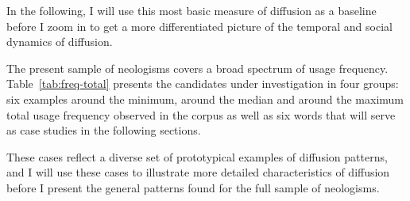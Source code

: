 \documentclass[
  a4paper,
  abstract=on,
  captions=tableabove
  ]{scrartcl}
\begin{document}
  In the following, I will use this most basic measure of diffusion as a baseline before I zoom in to get a more differentiated picture of the temporal and social dynamics of diffusion.

  The present sample of neologisms covers a broad spectrum of usage frequency. Table~\ref{tab:freq-total} presents the candidates under investigation in four groups: six examples around the minimum, around the median and around the maximum total usage frequency observed in the corpus as well as six words that will serve as case studies in the following sections.

  These cases reflect a diverse set of prototypical examples of diffusion patterns, and I will use these cases to illustrate more detailed characteristics of diffusion before I present the general patterns found for the full sample of neologisms.
\end{document}
